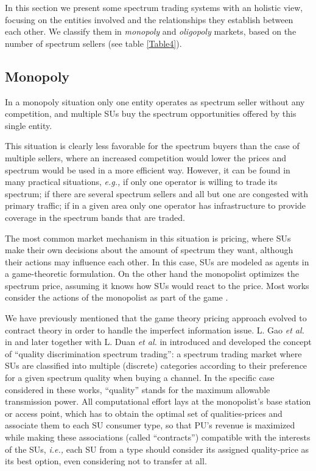 In this section we present some spectrum trading systems with an holistic view, focusing on the entities involved and the relationships they establish between each other. We classify them in \textit{monopoly} and \textit{oligopoly} markets, based on the number of spectrum sellers (see table \ref{Table4}).

\subsection{Monopoly}
\label{subsec:Mono}
In a monopoly situation only one entity operates as spectrum seller without any competition, and multiple SUs buy the spectrum opportunities offered by this single entity.

This situation is clearly less favorable for the spectrum buyers than the case of multiple sellers, where an increased competition would lower the prices and spectrum would be used in a more efficient way. However, it can be found in many practical situations, \textit{e.g.,} if only one operator is willing to trade its spectrum; if there are several spectrum sellers and all but one are congested with primary traffic; if in a given area only one operator has infrastructure to provide coverage in the spectrum bands that are traded.

The most common market mechanism in this situation is pricing, where SUs make their own decisions about the amount of spectrum they want, although their actions may influence each other. In this case, SUs are modeled as agents in a game-theoretic formulation. On the other hand the monopolist optimizes the spectrum price, assuming it knows how SUs would react to the price. Most works consider the actions of the monopolist as part of the game \cite{ref:Simeone2008,ref:Jayaweera2009,ref:Zhang2009,ref:Jayaweera2010,ref:Vazquez2010,ref:Yi2010}.

We have previously mentioned that the game theory pricing approach evolved to contract theory in order to handle the imperfect information issue. L. Gao \textit{et al.} in \cite{ref:Gao2011} and later together with L. Duan \textit{et al.} in \cite{ref:Duan2011_Contract} introduced and developed the concept of ``quality discrimination spectrum trading'': a spectrum trading market where SUs are classified into multiple (discrete) categories according to their preference for a given spectrum quality when buying a channel. In the specific case considered in these works, ``quality'' stands for the maximum allowable transmission power. All computational effort lays at the monopolist's base station or access point, which has to obtain the optimal set of qualities-prices and associate them to each SU consumer type, so that PU's revenue is maximized while making these associations (called ``contracts'') compatible with the interests of the SUs, \textit{i.e.,} each SU from a type should consider its assigned quality-price as its best option, even considering not to transfer at all.

